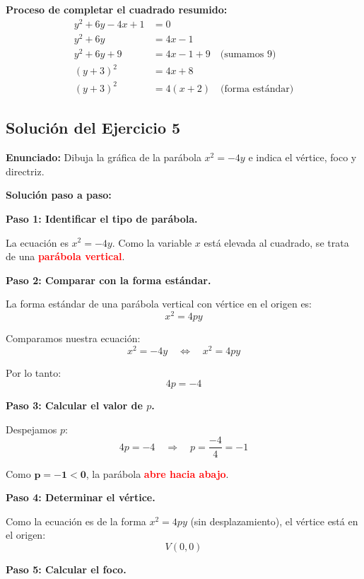 \documentclass[12pt,a4paper]{article}
\begin{document}
	\bigskip

	\textbf{Proceso de completar el cuadrado resumido:}
	\[
	\begin{aligned}
		y^2+6y-4x+1&=0 \\
		y^2+6y&=4x-1 \\
		y^2+6y+9&=4x-1+9 \quad\text{(sumamos 9)} \\
		(y+3)^2&=4x+8 \\
		(y+3)^2&=4(x+2) \quad\text{(forma estándar)}
	\end{aligned}
	\]

	\newpage

	\subsection*{Solución del Ejercicio 5}

	\textbf{Enunciado:} Dibuja la gráfica de la parábola \(x^2=-4y\) e indica el vértice, foco y directriz.

	\bigskip

	\textbf{Solución paso a paso:}

	\bigskip

	\textbf{Paso 1: Identificar el tipo de parábola.}

	La ecuación es \(x^2=-4y\). Como la variable \(x\) está elevada al cuadrado, se trata de una \textcolor{red}{\textbf{parábola vertical}}.

	\bigskip

	\textbf{Paso 2: Comparar con la forma estándar.}

	La forma estándar de una parábola vertical con vértice en el origen es:
	\[
	x^2=4py
	\]

	Comparamos nuestra ecuación:
	\[
	x^2=-4y \quad\Leftrightarrow\quad x^2=4py
	\]

	Por lo tanto:
	\[
	4p=-4
	\]

	\textbf{Paso 3: Calcular el valor de \(p\).}

	Despejamos \(p\):
	\[
	4p=-4 \quad\Rightarrow\quad p=\frac{-4}{4}=-1
	\]

	Como \(\mathbf{p=-1<0}\), la parábola \textcolor{red}{\textbf{abre hacia abajo}}.

	\bigskip

	\textbf{Paso 4: Determinar el vértice.}

	Como la ecuación es de la forma \(x^2=4py\) (sin desplazamiento), el vértice está en el origen:
	\[
	\boxed{V(0,0)}
	\]

	\textbf{Paso 5: Calcular el foco.}
\end{document}
